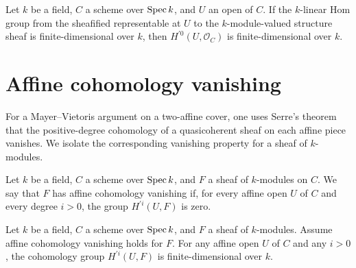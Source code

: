 \begin{theorem}\leanok
  \label{thm:Scheme_module_finite_HModule_prime_zero_curve}
  Let \(k\) be a field, \(C\) a scheme over \(\operatorname{Spec} k\), and \(U\) an open of \(C\). If the \(k\)-linear Hom group from the sheafified representable at \(U\) to the \(k\)-module-valued structure sheaf is finite-dimensional over \(k\), then \(H^{\prime 0}(U, \mathcal O_C)\) is finite-dimensional over \(k\).
\end{theorem}

\section{Affine cohomology vanishing}
\label{sec:IsAffineHModuleVanishing_iter040}

For a Mayer--Vietoris argument on a two-affine cover, one uses Serre's theorem that the positive-degree cohomology of a quasicoherent sheaf on each affine piece vanishes. We isolate the corresponding vanishing property for a sheaf of \(k\)-modules.

\begin{definition}\leanok
  \label{thm:Scheme_IsAffineHModuleVanishing}
  Let \(k\) be a field, \(C\) a scheme over \(\operatorname{Spec} k\), and \(F\) a sheaf of \(k\)-modules on \(C\). We say that \(F\) has affine cohomology vanishing if, for every affine open \(U\) of \(C\) and every degree \(i > 0\), the group \(H^{\prime i}(U, F)\) is zero.
\end{definition}

\begin{theorem}\leanok
  \label{thm:Scheme_module_finite_HModule_prime_of_isAffineHModuleVanishing}
  Let \(k\) be a field, \(C\) a scheme over \(\operatorname{Spec} k\), and \(F\) a sheaf of \(k\)-modules. Assume affine cohomology vanishing holds for \(F\). For any affine open \(U\) of \(C\) and any \(i > 0\), the cohomology group \(H^{\prime i}(U, F)\) is finite-dimensional over \(k\).
\end{theorem}

